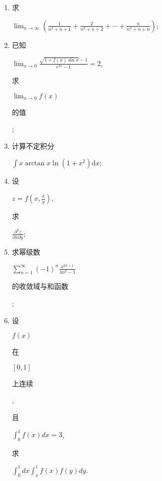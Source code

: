 \documentclass[10pt]{article}
\begin{document}
\begin{enumerate}
  \item \begin{CJK}{UTF8}{mj}求\end{CJK} $\lim _{n \rightarrow \infty}\left(\frac{1}{n^{2}+n+1}+\frac{2}{n^{2}+n+2}+\cdots+\frac{n}{n^{2}+n+n}\right)$;

  \item \begin{CJK}{UTF8}{mj}已知\end{CJK} $\lim _{x \rightarrow 0} \frac{\sqrt{1+f(x) \sin x}-1}{e^{3 x}-1}=2$, \begin{CJK}{UTF8}{mj}求\end{CJK} $\lim _{x \rightarrow 0} f(x)$ \begin{CJK}{UTF8}{mj}的值\end{CJK};

  \item \begin{CJK}{UTF8}{mj}计算不定积分\end{CJK} $\int x \arctan x \ln \left(1+x^{2}\right) \mathrm{d} x$;

  \item \begin{CJK}{UTF8}{mj}设\end{CJK} $z=f\left(x, \frac{x}{y}\right)$, \begin{CJK}{UTF8}{mj}求\end{CJK} $\frac{\partial^{2} z}{\partial x \partial y}$;

  \item \begin{CJK}{UTF8}{mj}求幂级数\end{CJK} $\sum_{n=1}^{\infty}(-1)^{n} \frac{x^{2 n+1}}{4 n^{2}-1}$ \begin{CJK}{UTF8}{mj}的收敛域与和函数\end{CJK};

  \item \begin{CJK}{UTF8}{mj}设\end{CJK} $f(x)$ \begin{CJK}{UTF8}{mj}在\end{CJK} $[0,1]$ \begin{CJK}{UTF8}{mj}上连续\end{CJK}, \begin{CJK}{UTF8}{mj}且\end{CJK} $\int_{0}^{1} f(x) d x=3$, \begin{CJK}{UTF8}{mj}求\end{CJK} $\int_{0}^{1} d x \int_{x}^{1} f(x) f(y) d y$.


\end{enumerate}
\end{document}
